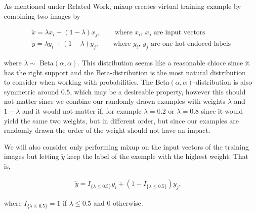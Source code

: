 \documentclass{article}
\begin{document}
As mentioned under Related Work, mixup creates virtual training example by combining two images by 

\begin{align*}
&\tilde{x} = \lambda x_i + (1-\lambda) x_j, \qquad \text{where $x_i$, $x_j$ are input vectors} \\
&\tilde{y} = \lambda y_i + (1-\lambda) y_j, \qquad \text{where $y_i$, $y_j$ are one-hot endoced labels}
\end{align*}

where $\lambda \sim$ Beta$(\alpha, \alpha)$.
 This distribution seems like a 
reasonable chioce since it has the right support and the Beta-distribution is the most natural distribution to
consider when working with probabilities. The Beta$(\alpha, \alpha)$-distribution is also symmetric around $0.5$, which may be 
a desireable property, however this should not matter since we combine our randomly drawn examples with weights $\lambda$ and $1-\lambda$ and 
it would not matter if, for example $\lambda = 0.2$ or $\lambda = 0.8$ since it would yield the same two weights, but in different order, but 
since our examples are randomly drawn the order of the weight should not have an impact. 

% 

We will also consider only performing mixup on the input vectors of the training images but letting $\tilde{y}$ keep the label of the exemple 
with the highest weight. That is,

\begin{align*}
\tilde{y} = I_{\{ \lambda \leq 0.5 \}} y_i + (1-I_{\{ \lambda \leq 0.5 \}}) y_j, 
\end{align*}

where $I_{\{ \lambda \leq 0.5 \}} = 1$ if $\lambda \leq 0.5$ and $0$ otherwise.
\end{document}
